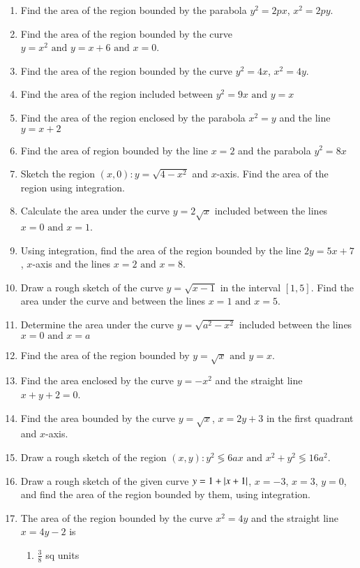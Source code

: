 \begin{enumerate}[label=\thesubsection.\arabic*,ref=\thesubsection.\theenumi]
\item Find the area of the region bounded by the parabola $y^2 = 2px$, $x^2 = 2py$.
\item Find the area of the region bounded by the curve $y = x^2\text{ and }y = x + 6\text{ and }x = 0$.
\item Find the area of the region bounded by the curve $y^2 = 4x$, $x^2 = 4y$.
\item Find the area of the region included between $y^2 = 9x\text{ and }y =x$
\item Find the area of the region enclosed by the parabola $x^2 = y$ and the line $y = x + 2$
\item Find the area of region bounded by the line $x = 2$ and the parabola $y^2 = 8x$
\item Sketch the region ${(x,0) : y = \sqrt{4 - x^2}}$ and $x$-axis. Find the area of the region using integration.
\item Calculate the area under the curve $y = 2\sqrt{x}$ included between the lines $x = 0\text{ and }x = 1$.
\item Using integration, find the area of the region bounded by the line $2y = 5x + 7$, $x$-axis and the lines $x = 2\text{ and }x =8$.
\item Draw a rough sketch of the curve $y = \sqrt{x - 1}$ in the interval $[1, 5]$. Find the area under the curve and between the lines $x = 1\text{ and }x = 5$.
\item Determine the area under the curve $y = \sqrt{a^2 - x^2}$ included between the lines $x = 0\text{ and }x = a$
\item Find the area of the region bounded by $y = \sqrt{x}\text{ and }y = x$.
\item Find the area enclosed by the curve $y = - x^2$ and the straight line $x + y + 2 = 0$.
\item Find the area bounded by the curve $y = \sqrt{x}$, $x = 2y + 3$ in the first quadrant and $x$-axis.
\item Draw a rough sketch of the region ${(x, y) : y^2 \lessgtr 6ax\text{ and }x^2 + y^2 \lessgtr 16a^2}$.
\item Draw a  rough sketch of the given curve $y =1 + \left\vert x + 1\right\vert$, $x = -3$, $x = 3$, $y = 0$, and find the area of the region bounded by them, using integration.
\item The area of the region bounded by the curve $x^2 = 4y$ and the straight line $x = 4y - 2$ is
\begin{enumerate}
\item $\frac{3}{8}$ sq units 

\end{enumerate}
\end{enumerate}
